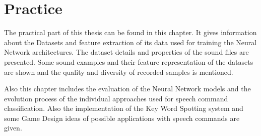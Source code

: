 \chapter{Practice}
The practical part of this thesis can be found in this chapter.
It gives information about the Datasets and feature extraction of its data used for training the Neural Network architectures.
The dataset details and properties of the sound files are presented.
Some sound examples and their feature representation of the datasets are shown and the quality and diversity of recorded samples is mentioned.

Also this chapter includes the evaluation of the Neural Network models and the evolution process of the individual approaches used for speech command classification.
Also the implementation of the Key Word Spotting system and some Game Design ideas of possible applications with speech commands are given.
















